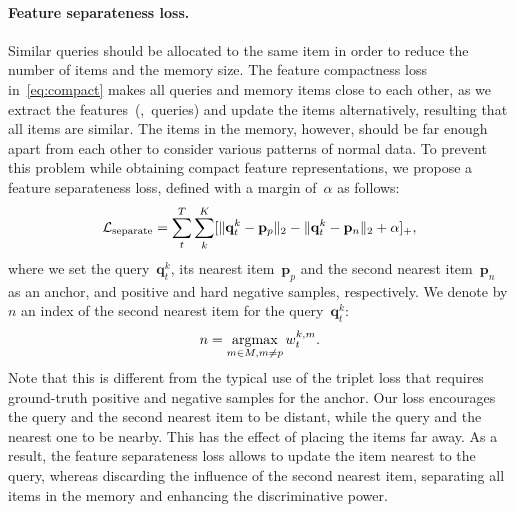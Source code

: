 \documentclass[10pt,twocolumn,letterpaper]{article}
\DeclareMathOperator*{\argmax}{argmax}
\begin{document}
\vspace{-0.4cm}			
		\paragraph{Feature separateness loss.}
			Similar queries should be allocated to the same item in order to reduce the number of items and the memory size. The feature compactness loss in~\eqref{eq:compact} makes all queries and memory items close to each other, as we extract the features~(\ie,~queries) and update the items alternatively, resulting that all items are similar. The items in the memory, however, should be far enough apart from each other to consider various patterns of normal data. To prevent this problem while obtaining compact feature representations, we propose a feature separateness loss, defined with a margin of~$\alpha$ as follows:
			\begin{equation}\label{eq:separate}
\vspace{-0.15cm}
				\mathcal{L}_\mathrm{separate}= \sum_{t}^{T} \sum_k^{K} [\|\mathbf{q}_t^k - \mathbf{p}_p\|_2-\|\mathbf{q}_t^k - \mathbf{p}_n\|_2 + \alpha ]_+,
\vspace{-0.1cm}
			\end{equation}
			where we set the query~$\mathbf{q}_t^k$, its nearest item~$\mathbf{p}_p$ and the second nearest item~$\mathbf{p}_n$ as an anchor, and positive and hard negative samples, respectively. We denote by $n$ an index of the second nearest item for the query~$\mathbf{q}_t^k$:
			\begin{equation}
\vspace{-0.1cm}
				n = \argmax_{\substack{m\in M, m\neq p}} w_t^{k,m}.	
\vspace{-0.1cm}
			\end{equation}
			Note that this is different from the typical use of the triplet loss that requires ground-truth positive and negative samples for the anchor. Our loss encourages the query and the second nearest item to be distant, while the query and the nearest one to be nearby. This has the effect of placing the items far away. As a result, the feature separateness loss allows to update the item nearest to the query, whereas discarding the influence of the second nearest item, separating all items in the memory and enhancing the discriminative power.
		
		
	
\vspace{-0.1cm}
\end{document}
